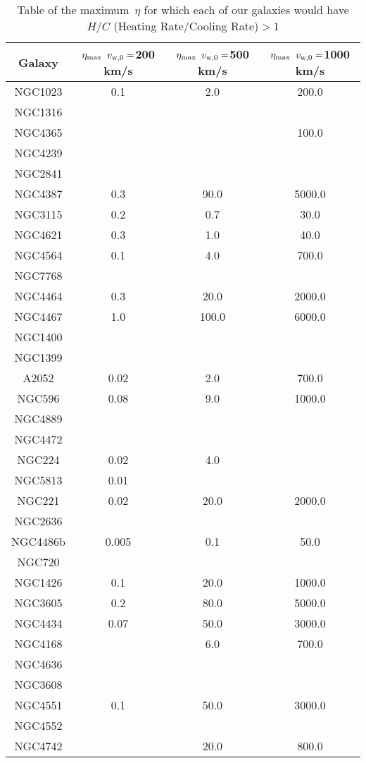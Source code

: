 \begin{table*}[htbp]
\caption{\label{tab:eta} Table of the maximum\
 $\eta$ for which each of our galaxies would have $H/C$ (Heating Rate/Cooling Rate)$>1$}
\begin{tabular}{cccc}
\hline
Galaxy & $\eta_{\rm max}$ $v_{\rm w,0}=$200 km/s & $\eta_{\rm max}$ $v_{\rm w,0}=$500 km/s & $\eta_{\rm max}$ $v_{\rm w,0}=$1000 km/s \\
\hline
NGC1023 & 0.1 & 2.0 & 200.0 \\
NGC1316 &  &  &  \\
NGC4365 &  &  & 100.0 \\
NGC4239 &  &  &  \\
NGC2841 &  &  &  \\
NGC4387 & 0.3 & 90.0 & 5000.0 \\
NGC3115 & 0.2 & 0.7 & 30.0 \\
NGC4621 & 0.3 & 1.0 & 40.0 \\
NGC4564 & 0.1 & 4.0 & 700.0 \\
NGC7768 &  &  &  \\
NGC4464 & 0.3 & 20.0 & 2000.0 \\
NGC4467 & 1.0 & 100.0 & 6000.0 \\
NGC1400 &  &  &  \\
NGC1399 &  &  &  \\
A2052 & 0.02 & 2.0 & 700.0 \\
NGC596 & 0.08 & 9.0 & 1000.0 \\
NGC4889 &  &  &  \\
NGC4472 &  &  &  \\
NGC224 & 0.02 & 4.0 &  \\
NGC5813 & 0.01 &  &  \\
NGC221 & 0.02 & 20.0 & 2000.0 \\
NGC2636 &  &  &  \\
NGC4486b & 0.005 & 0.1 & 50.0 \\
NGC720 &  &  &  \\
NGC1426 & 0.1 & 20.0 & 1000.0 \\
NGC3605 & 0.2 & 80.0 & 5000.0 \\
NGC4434 & 0.07 & 50.0 & 3000.0 \\
NGC4168 &  & 6.0 & 700.0 \\
NGC4636 &  &  &  \\
NGC3608 &  &  &  \\
NGC4551 & 0.1 & 50.0 & 3000.0 \\
NGC4552 &  &  &  \\
NGC4742 &  & 20.0 & 800.0 \\

\end{tabular}
\end{table*}
